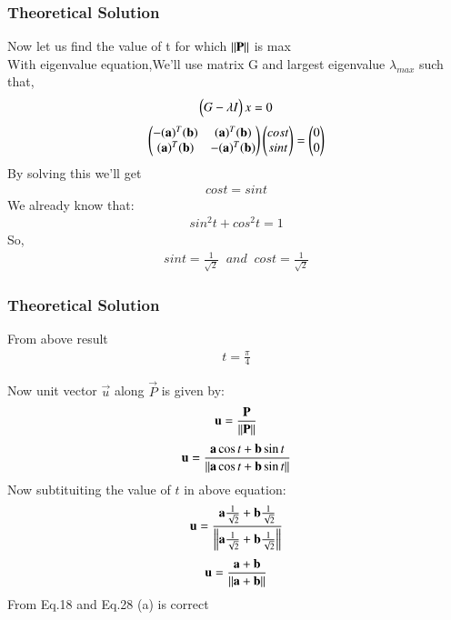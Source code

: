 \documentclass{beamer}
\begin{document}
\begin{frame}
\frametitle{Theoretical Solution}
    Now let us find the value of t for which $\norm{\Vec{P}}$ is max\\
With eigenvalue equation,We'll use matrix G and largest eigenvalue $\lambda_{max}$ such that,
\begin{align}
    \begin{pmatrix}G-\lambda I\end{pmatrix}x=0
\end{align}
\begin{align}
    \myvec{-(\Vec{a})^T(\Vec{b})&(\Vec{a})^T(\Vec{b})\\(\Vec{a})^T(\Vec{b})&-(\Vec{a})^T(\Vec{b})}\myvec{cost\\sint}=\myvec{0\\0}
\end{align}
By solving this we'll get 
\begin{align}
    cost=sint
\end{align}
We already know that:
\begin{align}
    sin^2t+cos^2t=1
\end{align}
So,
\begin{align}
    sint=\frac{1}{\sqrt{2}}\;\;and\;\; cost=\frac{1}{\sqrt{2}}
\end{align}

\end{frame}

\begin{frame}
\frametitle{Theoretical Solution}
    From above result
\begin{align}
    t=\frac{\pi}{4}
\end{align}

Now unit vector $\Vec{u}$ along $\Vec{P}$ is given by:
\begin{align}
    \Vec{{\Vec{u}}}=\frac{\Vec{P}}{\norm{\Vec{P}}}
\end{align}
\begin{align}
\Vec{\Vec{u}}=\frac{\vec{a}\cos{t} + \vec{b}\sin{t}}{\norm{\vec{a}\cos{t} + \vec{b}\sin{t}}}
\end{align}
Now subtituiting the value of $t$ in above equation:
\begin{align}
    \Vec{u}=\frac{\Vec{a}\frac{1}{\sqrt{2}} + \Vec{b}\frac{1}{\sqrt{2}}}{\norm{\Vec{a}\frac{1}{\sqrt{2}} + \Vec{b}\frac{1}{\sqrt{2}}}}
\end{align}
\begin{align}
    \Vec{u}=\frac{\Vec{a} + \Vec{b}}{\norm{\Vec{a} + \Vec{b}}}
\end{align}
From Eq.18 and Eq.28 (a) is correct
\end{frame}
\end{document}

